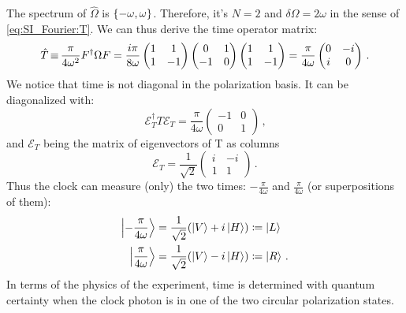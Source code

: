 The spectrum of $\hat{\Omega}$ is $\qty{-\omega, \omega}$.
Therefore, it's $N=2$ and $\delta\Omega = 2\omega$ in the sense of
\eqref{eq:SI_Fourier:T}.
We can thus derive the time operator matrix:
\begin{equation}
  \hat{T}
  \operatorname*{\equiv}
  \frac{\pi}{4\omega^2} F^{\dagger} \Omega F
  =
  \frac{i\pi}{8\omega}
  \begin{pmatrix}
    1 & 1 \\
    1 & -1
  \end{pmatrix}
  \begin{pmatrix}
    0 & 1 \\
   -1 & 0
  \end{pmatrix}
  \begin{pmatrix}
    1 & 1 \\
    1 & -1
  \end{pmatrix}
  =
  \frac{\pi}{4\omega}
  \begin{pmatrix}
    0 & -i \\
    i &  0
  \end{pmatrix}
  \,\text{.}
\end{equation}
We notice that time is not diagonal in the polarization basis.
It can be diagonalized with:
\begin{equation}\label{eq:moreva_diag_T}
  \mathcal{E}_T^{\dagger} T \mathcal{E}_T
  =
\frac{\pi}{4\omega}
\begin{pmatrix}
  -1  & 0 \\
  0   & 1
\end{pmatrix}
\,\text{,}
\end{equation}
and $\mathcal{E}_T$ being the matrix of eigenvectors of T as columns
\begin{equation}
  \mathcal{E}_T
  =
  \frac{1}{\sqrt{2}}
  \begin{pmatrix}
    i & -i \\
    1 & 1
  \end{pmatrix}
  \,\text{.}
\end{equation}
Thus the clock can measure (only) the two times: $-\frac{\pi}{4\omega}$ and $\frac{\pi}{4\omega}$
(or superpositions of them):
\begin{align}
  \ket{-\frac{\pi}{4\omega}} &= \frac{1}{\sqrt{2}} \qty(\ket{V}+i\ket{H}) \coloneqq \ket{L} \\
  \ket{ \frac{\pi}{4\omega}} &= \frac{1}{\sqrt{2}} \qty(\ket{V}-i\ket{H}) \coloneqq \ket{R} \, \text{.}
\end{align}
In terms of the physics of the experiment,
time is determined with quantum certainty when the clock photon is
in one of the two circular polarization states.

